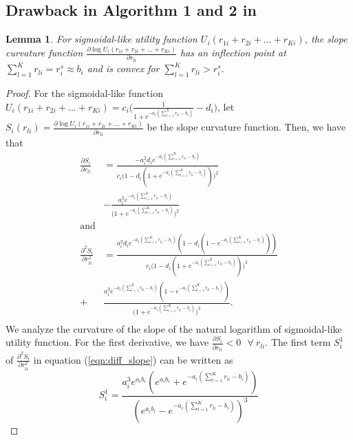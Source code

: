 \documentclass[journal]{IEEEtran} 		\usepackage{amsmath,amssymb}
\newtheorem{lem}[thm]{Lemma}
\begin{document}
\subsection{Drawback in Algorithm 1 and 2 in \cite{Ahmed_Utility4}}\label{sec:conv_drawbacks}
\begin{lem}\label{lem:slope_curve}
For sigmoidal-like utility function $U_i(r_{1i}+r_{2i}+ ...+r_{Ki})$,  the slope curvature function $\frac{\partial \log U_i(r_{1i}+r_{2i}+ ...+r_{Ki})}{\partial r_{li}}$ has an inflection point at $\sum_{l=1}^{K}r_{li} = r_i^{s} \approx b_i$ and is convex for $\sum_{l=1}^{K}r_{li} > r_i^{s}$.
\end{lem}
\begin{proof}
For the sigmoidal-like function $U_i(r_{1i}+r_{2i}+ ...+r_{Ki}) = c_i\Big(\frac{1}{1+e^{-a_i(\sum_{l=1}^{K}r_{li}-b_i)}}-d_i\Big)$, let $S_i(r_{li}) = \frac{\partial \log U_i(r_{1i}+r_{2i}+ ...+r_{Ki})}{\partial r_{li}}$ be the slope curvature function. Then, we have that
\begin{equation}
\begin{aligned}\label{eqn:diff_slope}
\frac{\partial S_i}{\partial r_{li}} &= \frac{-a_i^2d_ie^{-a_i(\sum_{l=1}^{K}r_{li}-b_i)}}{c_i\Big(1-d_i(1+e^{-a_i(\sum_{l=1}^{K}r_{li}-b_i)})\Big)^2} \\
&- \frac{a_i^2e^{-a_i(\sum_{l=1}^{K}r_{li}-b_i)}}{\Big(1+e^{-a_i(\sum_{l=1}^{K}r_{li}-b_i)}\Big)^2}\\
\text{and}\\
\frac{\partial^2 S_i}{\partial r_{li}^2}& = \frac{a_i^3d_ie^{-a_i(\sum_{l=1}^{K}r_{li}-b_i)}(1-d_i(1-e^{-a_i(\sum_{l=1}^{K}r_{li}-b_i)}))}{c_i\Big(1-d_i(1+e^{-a_i(\sum_{l=1}^{K}r_{li}-b_i)})\Big)^3} \\
+& \frac{a_i^3e^{-a_i(\sum_{l=1}^{K}r_{li}-b_i)}(1-e^{-a_i(\sum_{l=1}^{K}r_{li}-b_i)})}{\Big(1+e^{-a_i(\sum_{l=1}^{K}r_{li}-b_i)}\Big)^3}.\\
\end{aligned}
\end{equation}
We analyze the curvature of the slope of the natural logarithm of sigmoidal-like utility function. For the first derivative, we have $\frac{\partial S_i}{\partial r_{li}}<0 \:\:\:\forall\: r_{li}$. The first term $S^1_i$ of $\frac{\partial^2 S_i}{\partial r_{li}^2}$ in equation (\ref{eqn:diff_slope}) can be written as
\begin{equation}\label{eqn:slope_fn}
S^1_i = \frac{a_i^3e^{a_ib_i}(e^{a_ib_i}+e^{-a_i(\sum_{l=1}^{K}r_{li}-b_i)})}{(e^{a_ib_i}-e^{-a_i(\sum_{l=1}^{K}r_{li}-b_i)})^3}
\end{equation}

\end{proof}
\end{document}
